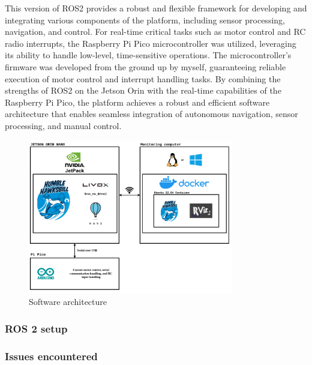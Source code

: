 \documentclass[11pt]{article}
\begin{document}
            This version of ROS2 provides a robust and flexible framework for developing and integrating various components of the platform, including sensor processing, navigation, and control. For real-time critical tasks such as motor control and RC radio interrupts, the Raspberry Pi Pico microcontroller was utilized, leveraging its ability to handle low-level, time-sensitive operations. The microcontroller's firmware was developed from the ground up by myself, guaranteeing reliable execution of motor control and interrupt handling tasks. By combining the strengths of ROS2 on the Jetson Orin with the real-time capabilities of the Raspberry Pi Pico, the platform achieves a robust and efficient software architecture that enables seamless integration of autonomous navigation, sensor processing, and manual control.

            \begin{figure}[H]
                \centering
                \includegraphics[width=0.8\textwidth]{Images/Software architecture rover.drawio.png}
                \caption{Software architecture}
                \label{fig:SW_architecture}
            \end{figure}


            \subsubsection{ROS 2 setup}
            
            

            \subsubsection{Issues encountered}
                
\end{document}
